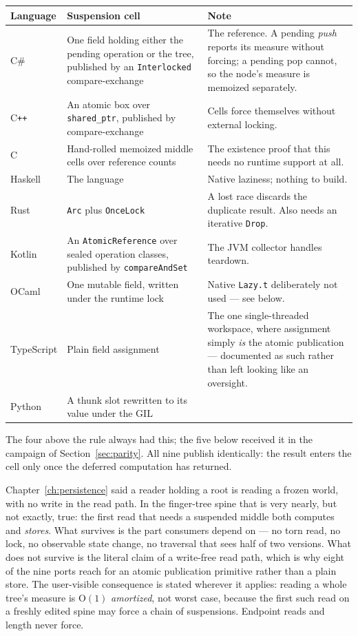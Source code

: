 \documentclass[11pt,twoside,openright]{book}
\makeatletter
\newcommand{\code}[1]{\texorpdfstring{\textcolor{d7ink}{\texttt{#1}}}{#1}}
\newcommand{\bigoh}[1]{$\mathrm{O}(#1)$}
\newenvironment{d7tablethree}[2]
  {\par\vspace{3pt}\small
   \setlength{\LTpre}{4pt}\setlength{\LTpost}{4pt}
   \begin{longtable}{@{}%
     >{\raggedright\arraybackslash}p{#1\textwidth}%
     @{\hspace{8pt}}>{\raggedright\arraybackslash}p{#2\textwidth}%
     @{\hspace{8pt}}>{\raggedright\arraybackslash}p{\dimexpr\textwidth-#1\textwidth-#2\textwidth-16pt\relax}@{}}}
  {\end{longtable}}
\newcommand{\thead}[1]{\sffamily\bfseries\footnotesize\color{d7ink}#1}
\makeatother
\begin{document}
\begin{d7tablethree}{0.13}{0.33}
\toprule
\thead{Language} & \thead{Suspension cell} & \thead{Note} \\
\midrule
C\#         & One field holding either the pending operation or the tree,
published by an \code{Interlocked} compare-exchange & The reference. A pending
\emph{push} reports its measure without forcing; a pending pop cannot, so the
node's measure is memoized separately. \\
C\texttt{++} & An atomic box over \code{shared\_ptr}, published by
compare-exchange & Cells force themselves without external locking. \\
C           & Hand-rolled memoized middle cells over reference counts & The
existence proof that this needs no runtime support at all. \\
Haskell     & The language & Native laziness; nothing to build. \\
\midrule
Rust        & \code{Arc} plus \code{OnceLock} & A lost race discards the
duplicate result. Also needs an iterative \code{Drop}. \\
Kotlin      & An \code{AtomicReference} over sealed operation classes,
published by \code{compareAndSet} & The JVM collector handles teardown. \\
OCaml       & One mutable field, written under the runtime lock & Native
\code{Lazy.t} deliberately not used --- see below. \\
TypeScript  & Plain field assignment & The one single-threaded workspace, where
assignment simply \emph{is} the atomic publication --- documented as such rather
than left looking like an oversight. \\
Python      & A thunk slot rewritten to its value under the GIL & \\
\bottomrule
\end{d7tablethree}

The four above the rule always had this; the five below received it in the
campaign of Section~\ref{sec:parity}. All nine publish identically: the result
enters the cell only once the deferred computation has returned.

\begin{caveatbox}
Chapter~\ref{ch:persistence} said a reader holding a root is reading a frozen
world, with no write in the read path. In the finger-tree spine that is very
nearly, but not exactly, true: the first read that needs a suspended middle both
computes and \emph{stores}. What survives is the part consumers depend on --- no
torn read, no lock, no observable state change, no traversal that sees half of
two versions. What does not survive is the literal claim of a write-free read
path, which is why eight of the nine ports reach for an atomic publication
primitive rather than a plain store. The user-visible consequence is stated
wherever it applies: reading a whole tree's measure is \bigoh{1} \emph{amortized},
not worst case, because the first such read on a freshly edited spine may force
a chain of suspensions. Endpoint reads and length never force.
\end{caveatbox}
\end{document}
